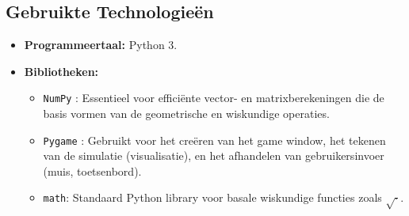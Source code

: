 \documentclass[11pt, a4paper]{article}
\begin{document}
\subsection{Gebruikte Technologieën}
\begin{itemize}
    \item \textbf{Programmeertaal:} Python 3.
    \item \textbf{Bibliotheken:}
        \begin{itemize}
            \item \texttt{NumPy} \parencite{NumPy}: Essentieel voor efficiënte vector- en matrixberekeningen die de basis vormen van de geometrische en wiskundige operaties.
            \item \texttt{Pygame} \parencite{Pygame}: Gebruikt voor het creëren van het game window, het tekenen van de simulatie (visualisatie), en het afhandelen van gebruikersinvoer (muis, toetsenbord).
            \item \texttt{math}: Standaard Python library voor basale wiskundige functies zoals $\sqrt{\cdot}$.
        \end{itemize}
\end{itemize}
\newpage
\end{document}

